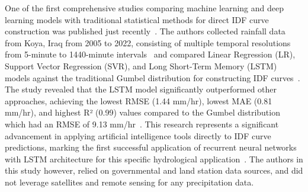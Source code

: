 One of the first comprehensive studies comparing machine learning and deep learning models with traditional statistical methods for direct IDF curve construction was published just recently~\cite{idfkoya}. The authors collected rainfall data from Koya, Iraq from 2005 to 2022, consisting of multiple temporal resolutions from 5-minute to 1440-minute intervals~\cite{idfkoya} and compared Linear Regression (LR), Support Vector Regression (SVR), and Long Short-Term Memory (LSTM) models against the traditional Gumbel distribution for constructing IDF curves~\cite{idfkoya}. The study revealed that the LSTM model significantly outperformed other approaches, achieving the lowest RMSE (1.44 mm/hr), lowest MAE (0.81 mm/hr), and highest R² (0.99) values compared to the Gumbel distribution which had an RMSE of 9.13 mm/hr~\cite{idfkoya}. This research represents a significant advancement in applying artificial intelligence tools directly to IDF curve predictions, marking the first successful application of recurrent neural networks with LSTM architecture for this specific hydrological application~\cite{idfkoya}. The authors in this study however, relied on governmental and land station data sources, and did not leverage satellites and remote sensing for any precipitation data.